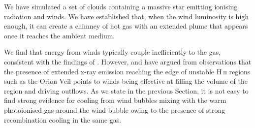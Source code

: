 \documentclass[a4paper,fleqn,usenatbib]{mnras}
\newcommand{\HII}{H$~$\textsc{ii}\xspace}
\begin{document}
We have simulated a set of clouds containing a massive star emitting ionising radiation and winds. We have established that, when the wind luminosity is high enough, it can create a chimney of hot gas with an extended plume that appears once it reaches the ambient medium. 

We find that energy from winds typically couple inefficiently to the gas, consistent with the findings of \cite{Dale2014}. However, \cite{Guedel2007} and \cite{Pabst2019} have argued from observations that the presence of extended x-ray emission reaching the edge of unstable \HII regions such as the Orion Veil points to winds being effective at filling the volume of the region and driving outflows. As we state in the previous Section, it is not easy to find strong evidence for cooling from wind bubbles mixing with the warm photoionised gas around the wind bubble owing to the presence of strong recombination cooling in the same gas.
\end{document}
